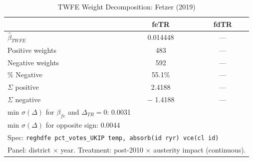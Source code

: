 \begin{table}[htbp]
\centering
\caption{TWFE Weight Decomposition: Fetzer (2019)}
\label{tab:fetzer_weights}
\begin{tabular}{lcc}
\hline\hline
 & feTR & fdTR \\
\hline
$\hat{\beta}_{TWFE}$ &     0.014448 & --- \\
Positive weights &       483 & --- \\
Negative weights &       592 & --- \\
\% Negative &  55.1\% & --- \\
$\Sigma$ positive &    2.4188 & --- \\
$\Sigma$ negative & $-$   1.4188 & --- \\
\hline
\multicolumn{3}{l}{\footnotesize min $\sigma(\Delta)$ for $\beta_{fe}$ and $\Delta_{TR}=0$:    0.0031} \\
\multicolumn{3}{l}{\footnotesize min $\sigma(\Delta)$ for opposite sign:    0.0044} \\
\hline
\multicolumn{3}{l}{\footnotesize Spec: \texttt{reghdfe pct\_votes\_UKIP temp, absorb(id ryr) vce(cl id)}} \\
\multicolumn{3}{l}{\footnotesize Panel: district $\times$ year. Treatment: post-2010 $\times$ austerity impact (continuous).} \\
\hline\hline
\end{tabular}
\end{table}
